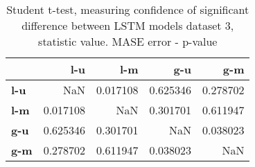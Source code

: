 \begin{table}[h]
\centering
\caption{Student t-test, measuring confidence of significant difference between LSTM models dataset 3, statistic value. MASE error - p-value}
\label{table:ttest-p-values-lstm-experiments-MASE-dataset-3}
\begin{tabular}{lrrrr}
\toprule
{} &       l-u &       l-m &       g-u &       g-m \\
\midrule
\textbf{l-u} &       NaN &  0.017108 &  0.625346 &  0.278702 \\
\textbf{l-m} &  0.017108 &       NaN &  0.301701 &  0.611947 \\
\textbf{g-u} &  0.625346 &  0.301701 &       NaN &  0.038023 \\
\textbf{g-m} &  0.278702 &  0.611947 &  0.038023 &       NaN \\
\bottomrule
\end{tabular}
\end{table}
